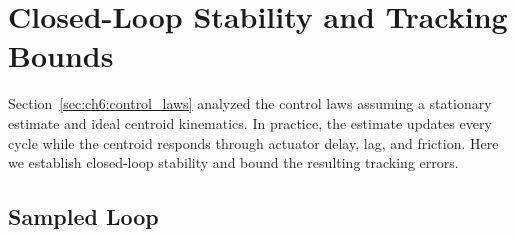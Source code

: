 \section{Closed-Loop Stability and Tracking Bounds}
\label{sec:ch6:stability}

Section~\ref{sec:ch6:control_laws} analyzed the control laws assuming a stationary estimate and ideal centroid kinematics. In practice, the estimate updates every cycle while the centroid responds through actuator delay, lag, and friction. Here we establish closed-loop stability and bound the resulting tracking errors.

\subsection{Sampled Loop}
\label{sec:ch6:sampled_loop}

